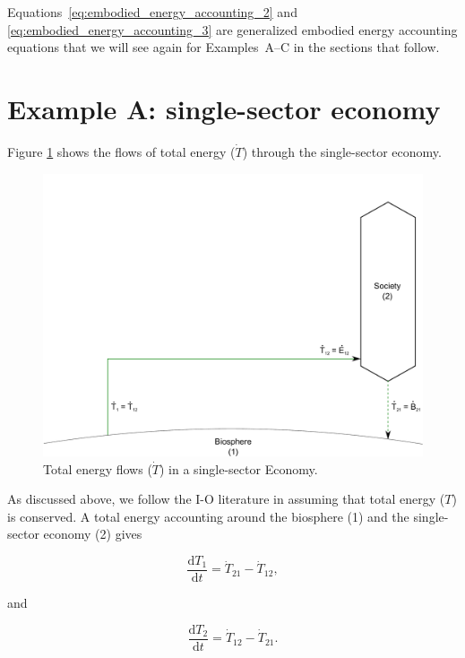 Equations~\ref{eq:embodied_energy_accounting_2}
and \ref{eq:embodied_energy_accounting_3} are generalized
embodied energy accounting equations that we will
see again for Examples~A--C in the sections that follow.


\section{Example A: single-sector economy}

Figure \ref{fig:A_total_energy_T_dot} shows the flows 
of total energy ($\dot{T}$) through the single-sector economy.

\begin{figure}[h!]
\includegraphics[width=1.0\linewidth]{Part_2/Chapter_Embodied/images/1_sector_embodied_energy.pdf}
\caption{Total energy flows ($\dot{T}$) in a single-sector Economy.}
\label{fig:A_total_energy_T_dot}
\end{figure}

As discussed above, we follow the I-O literature in assuming that 
total energy ($T$) is conserved. 
A total energy accounting around the biosphere (1)
and the single-sector economy (2) gives

\begin{equation} \label{eq:A_T_acct_1}
	\frac{\mathrm{d}T_{1}}{\mathrm{d}t} 
	= \dot{T}_{21} 
	- \dot{T}_{12},
\end{equation}

\noindent and

\begin{equation} \label{eq:A_T_acct_2}
	\frac{\mathrm{d}T_{2}}{\mathrm{d}t} 
	= \dot{T}_{12} 
	- \dot{T}_{21}.
\end{equation}


